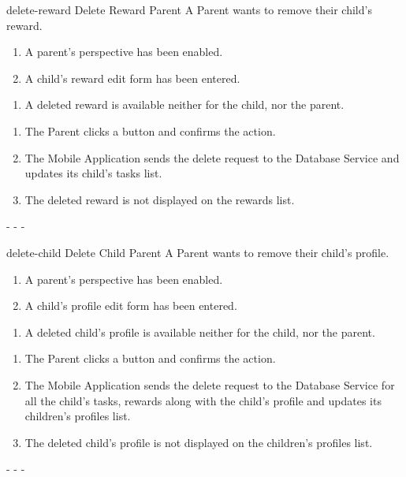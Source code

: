 {delete-reward}
{Delete Reward}
{Parent}
{A Parent wants to remove their child's reward.}
{\begin{enumerate} %
    \item A parent's perspective has been enabled.
    \item A child's reward edit form has been entered.
\end{enumerate}}
{\begin{enumerate} %
   \item A deleted reward is available neither for the child, nor the parent.
\end{enumerate}}
{\begin{enumerate} %
   \item The Parent clicks a  button and confirms the action.
   \item The Mobile Application sends the delete request to the Database Service and updates its child's tasks list.
   \item The deleted reward is not displayed on the rewards list.
\end{enumerate}}
{-} %
{-} %
{-} %

{delete-child}
{Delete Child}
{Parent}
{A Parent wants to remove their child's profile.}
{\begin{enumerate} %
    \item A parent's perspective has been enabled.
    \item A child's profile edit form has been entered.
\end{enumerate}}
{\begin{enumerate} %
   \item A deleted child's profile is available neither for the child, nor the parent.
\end{enumerate}}
{\begin{enumerate} %
   \item The Parent clicks a  button and confirms the action.
   \item The Mobile Application sends the delete request to the Database Service for all the child's tasks, rewards along with the child's profile and updates its children's profiles list.
   \item The deleted child's profile is not displayed on the children's profiles list.
\end{enumerate}}
{-} %
{-} %
{-} %


